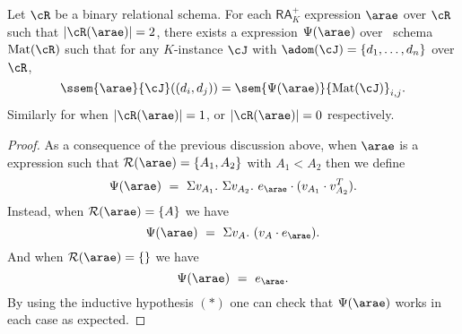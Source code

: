 \begin{ARATOSUM}
  Let $\cR$ be a binary relational schema. For each $\mathsf{RA}_{K}^+$  expression $\arae$ over $\cR$  such that $|\cR(\arae)| = 2$, there exists a \langsum  expression $\Psi(\arae)$ over \lang \ schema $\text{Mat}(\cR)$ such that for any $K$-instance $\cJ$ with $\adom(\cJ) = \{d_1, \ldots, d_n\}$ over $\cR$,
	$$
	\ssem{\arae}{\cJ}((d_i, d_j))=\sem{\Psi(\arae)}{\text{Mat}(\cJ)}_{i,j}.
	$$
	Similarly for when $|\cR(\arae)| = 1$, or $|\cR(\arae)| = 0$ respectively.
\end{ARATOSUM}
\begin{proof}
As a consequence of the previous discussion above, when $\arae$ is a \rak expression 
such that $\mathcal{R}(\arae)=\{A_1,A_2\}$ with $A_1<A_2$ then we define
$$
\Psi(\arae) \ = \ \Sigma v_{A_1}. \ \Sigma v_{A_2}. \ \earae \cdot (v_{A_1} \cdot v_{A_2}^T). 
$$
Instead, when $\mathcal{R}(\arae)=\{A\}$ we have
$$
\Psi(\arae) \ = \ \Sigma v_{A}. \  (v_{A} \cdot \earae). 
$$
And when $\mathcal{R}(\arae)=\{\}$ we have
$$
\Psi(\arae) \ = \ \earae.
$$
By using the inductive hypothesis $(*)$ one can check that $\Psi(\arae)$ works in each case as expected. 
\end{proof}
 




